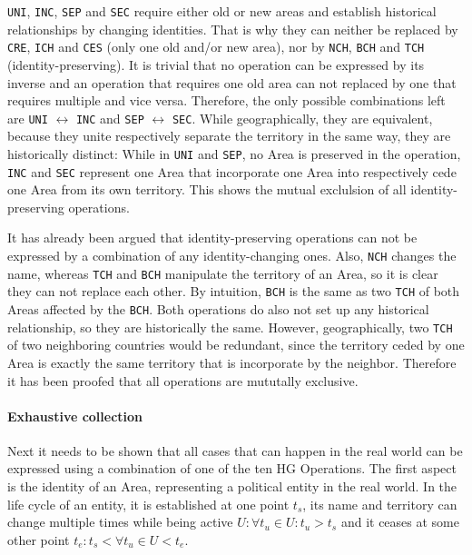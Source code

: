 \texttt{UNI}, \texttt{INC}, \texttt{SEP} and \texttt{SEC} require either old or new areas and establish historical relationships by changing identities. That is why they can neither be replaced by \texttt{CRE}, \texttt{ICH} and \texttt{CES} (only one old and/or new area), nor by \texttt{NCH}, \texttt{BCH} and \texttt{TCH} (identity-preserving). It is trivial that no operation can be expressed by its inverse and an operation that requires one old area can not replaced by one that requires multiple and vice versa. Therefore, the only possible combinations left are \texttt{UNI} $\leftrightarrow$ \texttt{INC} and \texttt{SEP} $\leftrightarrow$ \texttt{SEC}. While geographically, they are equivalent, because they unite respectively separate the territory in the same way, they are historically distinct: While in \texttt{UNI} and \texttt{SEP}, no Area is preserved in the operation, \texttt{INC} and \texttt{SEC} represent one Area that incorporate one Area into respectively cede one Area from its own territory. This shows the mutual exclulsion of all identity-preserving operations.

It has already been argued that identity-preserving operations can not be expressed by a combination of any identity-changing ones. Also, \texttt{NCH} changes the name, whereas \texttt{TCH} and \texttt{BCH} manipulate the territory of an Area, so it is clear they can not replace each other. By intuition, \texttt{BCH} is the same as two \texttt{TCH} of both Areas affected by the \texttt{BCH}. Both operations do also not set up any historical relationship, so they are historically the same. However, geographically, two \texttt{TCH} of two neighboring countries would be redundant, since the territory ceded by one Area is exactly the same territory that is incorporate by the neighbor. Therefore it has been proofed that all operations are mututally exclusive.


\paragraph{Exhaustive collection} %
\label{par:exhaustive_collection}

Next it needs to be shown that all cases that can happen in the real world can be expressed using a combination of one of the ten HG Operations. The first aspect is the identity of an Area, representing a political entity in the real world. In the life cycle of an entity, it is established at one point $t_s$, its name and territory can change multiple times while being active $U: \forall t_u \in U: t_u > t_s$ and it ceases at some other point $t_e: t_s < \forall t_u \in U < t_e$.



